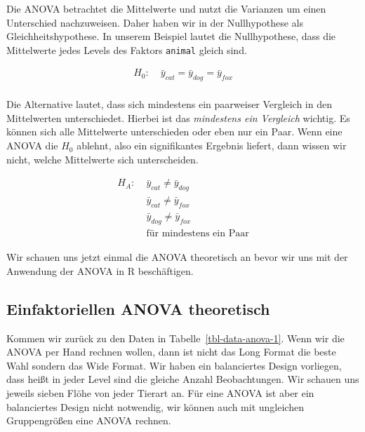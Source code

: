 \documentclass[
  letterpaper,
  DIV=11,
  oneside]{scrreport}
\begin{document}
Die ANOVA betrachtet die Mittelwerte und nutzt die Varianzen um einen
Unterschied nachzuweisen. Daher haben wir in der Nullhypothese als
Gleichheitshypothese. In unserem Beispiel lautet die Nullhypothese, dass
die Mittelwerte jedes Levels des Faktors \texttt{animal} gleich sind.

\begin{align*}
H_0: &\; \bar{y}_{cat} = \bar{y}_{dog} = \bar{y}_{fox}\\
\end{align*}

Die Alternative lautet, dass sich mindestens ein paarweiser Vergleich in
den Mittelwerten unterschiedet. Hierbei ist das \emph{mindestens ein
Vergleich} wichtig. Es können sich alle Mittelwerte unterschieden oder
eben nur ein Paar. Wenn eine ANOVA die \(H_0\) ablehnt, also ein
signifikantes Ergebnis liefert, dann wissen wir nicht, welche
Mittelwerte sich unterscheiden.

\begin{align*}
H_A: &\; \bar{y}_{cat} \ne \bar{y}_{dog}\\
\phantom{H_A:} &\; \bar{y}_{cat} \ne \bar{y}_{fox}\\
\phantom{H_A:} &\; \bar{y}_{dog} \ne \bar{y}_{fox}\\
\phantom{H_A:} &\; \mbox{für mindestens ein Paar}
\end{align*}

Wir schauen uns jetzt einmal die ANOVA theoretisch an bevor wir uns mit
der Anwendung der ANOVA in R beschäftigen.

\hypertarget{einfaktoriellen-anova-theoretisch}{%
\subsection{Einfaktoriellen ANOVA
theoretisch}\label{einfaktoriellen-anova-theoretisch}}

Kommen wir zurück zu den Daten in Tabelle~\ref{tbl-data-anova-1}. Wenn
wir die ANOVA per Hand rechnen wollen, dann ist nicht das Long Format
die beste Wahl sondern das Wide Format. Wir haben ein balanciertes
Design vorliegen, dass heißt in jeder Level sind die gleiche Anzahl
Beobachtungen. Wir schauen uns jeweils sieben Flöhe von jeder Tierart
an. Für eine ANOVA ist aber ein balanciertes Design nicht notwendig, wir
können auch mit ungleichen Gruppengrößen eine ANOVA rechnen.

{}
\end{document}
